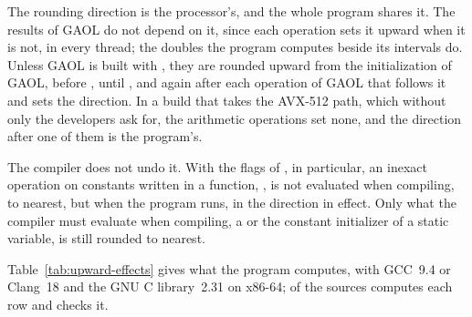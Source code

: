 \documentclass[12pt,a4paper,twoside,openright]{book}
\begin{document}
The rounding direction is the processor's, and the whole program shares it.
The results of GAOL do not depend on it, since each operation sets it upward
when it is not, in every thread; the doubles the program computes beside its
intervals do.\newinvfive{} Unless GAOL is built with
, they are rounded upward from the
initialization of GAOL, before , until , and
again after each operation of GAOL that follows it and sets the direction. In
a build that takes the AVX-512 path, which without
 only the developers ask for, the arithmetic
operations set none, and the direction after one of them is the program's.

\medskip
The compiler does not undo it. With the flags of ,
 in particular, an inexact operation on constants
written in a function, , is not evaluated when compiling, to
nearest, but when the program runs, in the direction in effect. Only what the
compiler must evaluate when compiling, a  or the constant
initializer of a static variable, is still rounded to nearest.

\medskip
Table~\ref{tab:upward-effects} gives what the program computes, with GCC~9.4
or Clang~18 and the GNU C library~2.31 on x86-64;
 of the sources computes each row
and checks it.
\end{document}
